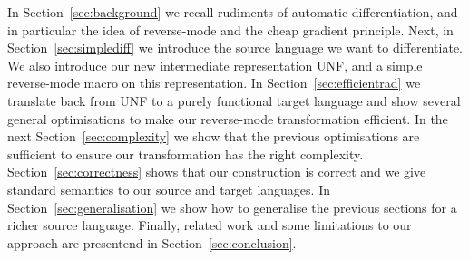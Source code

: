 In Section~\ref{sec:background} we recall rudiments of automatic differentiation, and in particular the idea of reverse-mode and the cheap gradient principle.
Next, in Section~\ref{sec:simplediff} we introduce the source language we want to differentiate. We also introduce our new intermediate representation UNF, and a simple reverse-mode macro on this representation.
In Section~\ref{sec:efficientrad} we translate back from UNF to a purely functional target language and show several general optimisations to make our reverse-mode transformation efficient.
In the next Section~\ref{sec:complexity} we show that the previous optimisations are sufficient to ensure our transformation has the right complexity.
Section~\ref{sec:correctness} shows that our construction is correct and we give standard semantics to our source and target languages. 
In Section~\ref{sec:generalisation} we show how to generalise the previous sections for a richer source language. 
Finally, related work and some limitations to our approach are presentend in Section~\ref{sec:conclusion}.